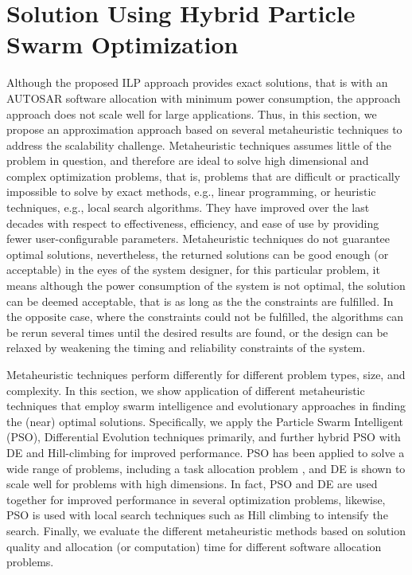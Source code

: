 \section{Solution Using Hybrid Particle Swarm Optimization}
Although the proposed ILP approach provides exact solutions, that is with an AUTOSAR software allocation with minimum power consumption, the approach approach does not scale well for large applications. Thus, in this section, we propose an approximation approach based on several metaheuristic techniques to address the scalability challenge. Metaheuristic techniques assumes little of the problem in question, and therefore are ideal to solve high dimensional and complex optimization problems, that is, problems that are difficult or practically impossible to solve by exact methods, e.g., linear programming, or heuristic techniques, e.g., local search algorithms. They have improved over the last decades with respect to effectiveness, efficiency, and ease of use by providing fewer user-configurable parameters. Metaheuristic techniques do not guarantee optimal solutions, nevertheless, the returned solutions can be good enough (or acceptable) in the eyes of the system designer, for this particular problem, it means although the power consumption of the system is not optimal, the solution can be deemed acceptable, that is as long as the the constraints are fulfilled. In the opposite case, where the constraints could not be fulfilled, the algorithms can be rerun several times until the desired results are found, or the design can be relaxed by weakening the timing and reliability constraints of the system.

Metaheuristic techniques perform differently for different problem types, size, and complexity. In this section, we show application of different metaheuristic techniques that employ swarm intelligence and evolutionary approaches in finding the (near) optimal solutions. Specifically, we apply the Particle Swarm Intelligent (PSO), Differential Evolution techniques primarily, and further hybrid PSO with DE and Hill-climbing for improved performance. PSO has been applied to solve a wide range of problems, including a task allocation problem \cite{yin2007task}, and DE is shown to scale well for problems with high dimensions. In fact, PSO and DE are used together for improved performance in several optimization problems, likewise, PSO is used with local search techniques such as Hill climbing to intensify the search. Finally, we evaluate the different metaheuristic methods based on solution quality and allocation (or computation) time for different software allocation problems.

